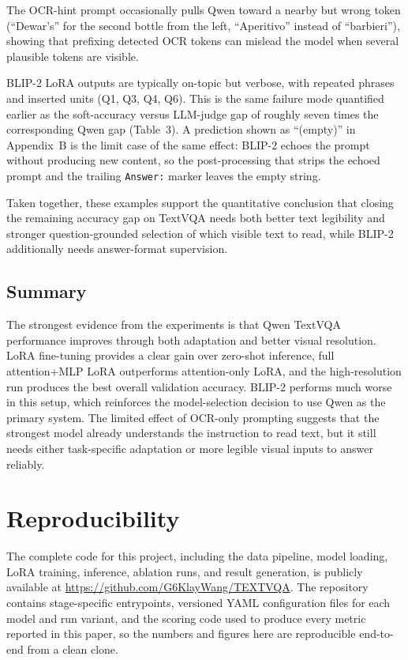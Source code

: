 \documentclass[11pt]{article}
\begin{document}
The OCR-hint prompt occasionally pulls Qwen toward a nearby but wrong token (``Dewar's'' for the second bottle from the left, ``Aperitivo'' instead of ``barbieri''), showing that prefixing detected OCR tokens can mislead the model when several plausible tokens are visible.

BLIP-2 LoRA outputs are typically on-topic but verbose, with repeated phrases and inserted units (Q1, Q3, Q4, Q6). This is the same failure mode quantified earlier as the soft-accuracy versus LLM-judge gap of roughly seven times the corresponding Qwen gap (Table~3). A prediction shown as ``(empty)'' in Appendix~B is the limit case of the same effect: BLIP-2 echoes the prompt without producing new content, so the post-processing that strips the echoed prompt and the trailing \texttt{Answer:} marker leaves the empty string.

Taken together, these examples support the quantitative conclusion that closing the remaining accuracy gap on TextVQA needs both better text legibility and stronger question-grounded selection of which visible text to read, while BLIP-2 additionally needs answer-format supervision.

\subsection{Summary}

The strongest evidence from the experiments is that Qwen TextVQA performance improves through both adaptation and better visual resolution. LoRA fine-tuning provides a clear gain over zero-shot inference, full attention+MLP LoRA outperforms attention-only LoRA, and the high-resolution run produces the best overall validation accuracy. BLIP-2 performs much worse in this setup, which reinforces the model-selection decision to use Qwen as the primary system. The limited effect of OCR-only prompting suggests that the strongest model already understands the instruction to read text, but it still needs either task-specific adaptation or more legible visual inputs to answer reliably.

\section{Reproducibility}

The complete code for this project, including the data pipeline, model loading, LoRA training, inference, ablation runs, and result generation, is publicly available at \url{https://github.com/G6KlayWang/TEXTVQA}. The repository contains stage-specific entrypoints, versioned YAML configuration files for each model and run variant, and the scoring code used to produce every metric reported in this paper, so the numbers and figures here are reproducible end-to-end from a clean clone.
\end{document}
